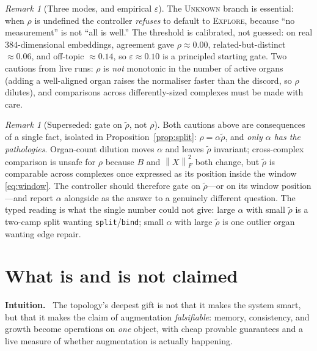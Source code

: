 \documentclass[11pt]{article}
\theoremstyle{definition}
\theoremstyle{plain}
\theoremstyle{remark}
\newtheorem{remark}[definition]{Remark}
\newcommand{\Intu}{\noindent\textbf{\color{intuitioncol}Intuition.}\ }
\newcommand{\norm}[1]{\left\lVert #1 \right\rVert}
\begin{document}
\begin{remark}[Three modes, and empirical $\varepsilon$]\label{rem:controller}
The \textsc{Unknown} branch is essential: when $\rho$ is undefined the controller
\emph{refuses} to default to \textsc{Explore}, because ``no measurement'' is not
``all is well.'' The threshold is calibrated, not guessed: on real $384$-dimensional
embeddings, agreement gave $\rho\approx0.00$, related-but-distinct $\approx0.06$, and
off-topic $\approx0.14$, so $\varepsilon\approx0.10$ is a principled starting gate.
Two cautions from live runs: $\rho$ is \emph{not} monotonic in the number of active
organs (adding a well-aligned organ raises the normaliser faster than the discord, so
$\rho$ dilutes), and comparisons across differently-sized complexes must be made with
care.
\end{remark}

\begin{remark}[Superseded: gate on $\tilde\rho$, not $\rho$]\label{rem:gate-tilde}
Both cautions above are consequences of a single fact, isolated in
Proposition~\ref{prop:split}: $\rho=\alpha\tilde\rho$, and \emph{only $\alpha$ has the
pathologies}. Organ-count dilution moves $\alpha$ and leaves $\tilde\rho$ invariant;
cross-complex comparison is unsafe for $\rho$ because $B$ and $\norm{X}_F^2$ both
change, but $\tilde\rho$ is comparable across complexes once expressed as its position
inside the window \eqref{eq:window}. The controller should therefore gate on
$\tilde\rho$---or on its window position---and report $\alpha$ alongside as the
answer to a genuinely different question. The typed reading is what the single number
could not give: large $\alpha$ with small $\tilde\rho$ is a two-camp split wanting
\texttt{split}/\texttt{bind}; small $\alpha$ with large $\tilde\rho$ is one outlier
organ wanting edge repair.
\end{remark}

\section{What is and is not claimed}\label{sec:limits}

\begin{intu}\Intu
The topology's deepest gift is not that it makes the system smart, but that it makes
the claim of augmentation \emph{falsifiable}: memory, consistency, and growth become
operations on \emph{one} object, with cheap provable guarantees and a live measure of
whether augmentation is actually happening.
\end{intu}
\end{document}
